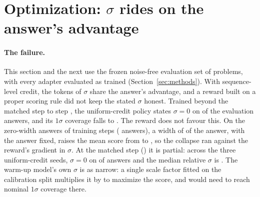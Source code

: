 \section{Optimization: $\sigma$ rides on the answer's advantage}
\label{sec:act1}


\paragraph{The failure.}
This section and the next use the frozen noise-free evaluation set of  problems, with every adapter evaluated as
trained (Section~\ref{sec:methods}).
With sequence-level credit, the tokens of $\sigma$ share the answer's advantage, and a reward built on a proper scoring
rule did not keep the stated $\sigma$ honest.
Trained beyond the matched step to step , the uniform-credit policy states $\sigma = 0$ on
 of the evaluation answers, and its $1\sigma$ coverage falls to .
The reward does not favour this.
On the zero-width answers of training steps  ( answers), a width of  of
the answer, with the answer fixed, raises the mean score from  to , so the collapse ran
against the reward's gradient in $\sigma$.
At the matched step () it is partial: across the three uniform-credit seeds, $\sigma = 0$ on
 of answers and the median relative $\sigma$ is .
The warm-up model's own $\sigma$ is as narrow: a single scale factor fitted on the calibration split multiplies it by
 to maximize the score, and would need  to reach nominal $1\sigma$ coverage
there.

